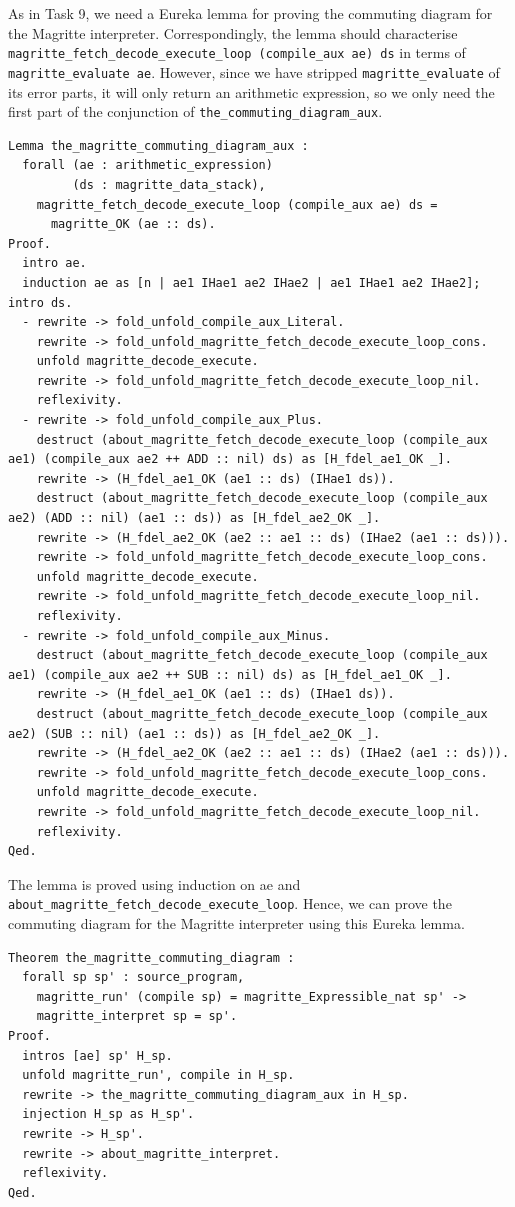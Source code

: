 \documentclass{article}
\begin{document}
As in Task 9, we need a Eureka lemma for proving the commuting diagram for the Magritte interpreter. Correspondingly, the lemma should characterise \texttt{magritte\_fetch\_decode\_execute\_loop (compile\_aux ae) ds} in terms of \texttt{magritte\_evaluate ae}. However, since we have stripped \texttt{magritte\_evaluate} of its error parts, it will only return an arithmetic expression, so we only need the first part of the conjunction of \texttt{the\_commuting\_diagram\_aux}. 
\begin{lstlisting}
Lemma the_magritte_commuting_diagram_aux :
  forall (ae : arithmetic_expression)
         (ds : magritte_data_stack),
    magritte_fetch_decode_execute_loop (compile_aux ae) ds =
      magritte_OK (ae :: ds).
Proof.
  intro ae.
  induction ae as [n | ae1 IHae1 ae2 IHae2 | ae1 IHae1 ae2 IHae2]; intro ds.
  - rewrite -> fold_unfold_compile_aux_Literal.
    rewrite -> fold_unfold_magritte_fetch_decode_execute_loop_cons.
    unfold magritte_decode_execute.   
    rewrite -> fold_unfold_magritte_fetch_decode_execute_loop_nil.
    reflexivity.
  - rewrite -> fold_unfold_compile_aux_Plus.
    destruct (about_magritte_fetch_decode_execute_loop (compile_aux ae1) (compile_aux ae2 ++ ADD :: nil) ds) as [H_fdel_ae1_OK _].
    rewrite -> (H_fdel_ae1_OK (ae1 :: ds) (IHae1 ds)).
    destruct (about_magritte_fetch_decode_execute_loop (compile_aux ae2) (ADD :: nil) (ae1 :: ds)) as [H_fdel_ae2_OK _].
    rewrite -> (H_fdel_ae2_OK (ae2 :: ae1 :: ds) (IHae2 (ae1 :: ds))).
    rewrite -> fold_unfold_magritte_fetch_decode_execute_loop_cons.
    unfold magritte_decode_execute.
    rewrite -> fold_unfold_magritte_fetch_decode_execute_loop_nil.
    reflexivity.
  - rewrite -> fold_unfold_compile_aux_Minus.
    destruct (about_magritte_fetch_decode_execute_loop (compile_aux ae1) (compile_aux ae2 ++ SUB :: nil) ds) as [H_fdel_ae1_OK _].
    rewrite -> (H_fdel_ae1_OK (ae1 :: ds) (IHae1 ds)).
    destruct (about_magritte_fetch_decode_execute_loop (compile_aux ae2) (SUB :: nil) (ae1 :: ds)) as [H_fdel_ae2_OK _].
    rewrite -> (H_fdel_ae2_OK (ae2 :: ae1 :: ds) (IHae2 (ae1 :: ds))).
    rewrite -> fold_unfold_magritte_fetch_decode_execute_loop_cons.
    unfold magritte_decode_execute.
    rewrite -> fold_unfold_magritte_fetch_decode_execute_loop_nil.
    reflexivity.
Qed.  
\end{lstlisting}

The lemma is proved using induction on ae and \texttt{about\_magritte\_fetch\_decode\_execute\_loop}. Hence, we can prove the commuting diagram for the Magritte interpreter using this Eureka lemma.
\begin{lstlisting}
Theorem the_magritte_commuting_diagram :
  forall sp sp' : source_program,
    magritte_run' (compile sp) = magritte_Expressible_nat sp' ->
    magritte_interpret sp = sp'.
Proof.
  intros [ae] sp' H_sp.
  unfold magritte_run', compile in H_sp.
  rewrite -> the_magritte_commuting_diagram_aux in H_sp.
  injection H_sp as H_sp'.
  rewrite -> H_sp'.
  rewrite -> about_magritte_interpret.
  reflexivity.
Qed.
\end{lstlisting}
\end{document}
